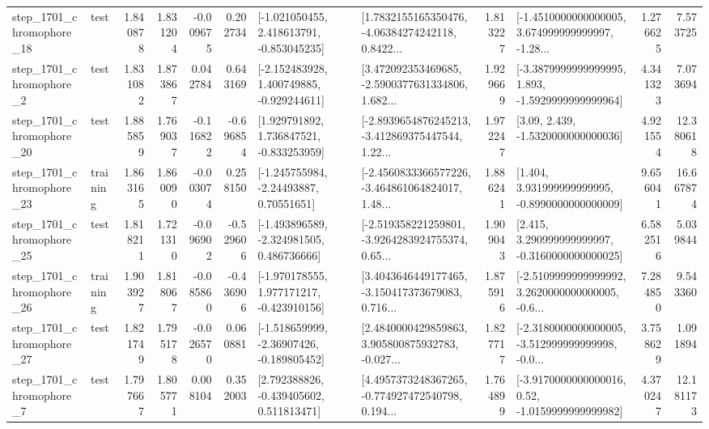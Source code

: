\begin{tabular}{llrrrrllrlrr}
 step\_1701\_chromophore\_18 &      test &      1.840878 &    1.831204 &     -0.009675 &  0.202734 &   [-1.021050455, 2.418613791, -0.853045235] &  [1.7832155165350476, -4.06384274242118, 0.8422... &       1.813227 &  [-1.4510000000000005, 3.674999999999997, -1.28... &            1.276625 &          7.573725 \\
  step\_1701\_chromophore\_2 &      test &      1.831082 &    1.873867 &      0.042784 &  0.643169 &   [-2.152483928, 1.400749885, -0.929244611] &  [3.472092353469685, -2.5900377631334806, 1.682... &       1.929669 &  [-3.3879999999999995, 1.893, -1.5929999999999964] &            4.341323 &          7.073694 \\
 step\_1701\_chromophore\_20 &      test &      1.885859 &    1.769037 &     -0.116822 & -0.696854 &    [1.929791892, 1.736847521, -0.833253959] &  [-2.8939654876245213, -3.412869375447544, 1.22... &       1.972247 &                 [3.09, 2.439, -1.5320000000000036] &            4.921554 &         12.380618 \\
 step\_1701\_chromophore\_23 &  training &      1.863165 &    1.860090 &     -0.003074 &  0.258150 &     [-1.245755984, -2.24493887, 0.70551651] &  [-2.4560833366577226, -3.464861064824017, 1.48... &       1.886241 &    [1.404, 3.931999999999995, -0.8990000000000009] &            9.656041 &         16.667874 \\
 step\_1701\_chromophore\_25 &      test &      1.818211 &    1.721310 &     -0.096902 & -0.529606 &   [-1.493896589, -2.324981505, 0.486736666] &  [-2.519358221259801, -3.9264283924755374, 0.65... &       1.909043 &    [2.415, 3.290999999999997, -0.3160000000000025] &            6.582516 &          5.039844 \\
 step\_1701\_chromophore\_26 &  training &      1.903927 &    1.818067 &     -0.085860 & -0.436906 &   [-1.970178555, 1.977171217, -0.423910156] &  [3.4043646449177465, -3.150417373679083, 0.716... &       1.875916 &  [-2.5109999999999992, 3.2620000000000005, -0.6... &            7.284850 &          9.543360 \\
 step\_1701\_chromophore\_27 &      test &      1.821749 &    1.795178 &     -0.026570 &  0.060881 &   [-1.518659999, -2.36907426, -0.189805452] &  [2.4840000429859863, 3.905800875932783, -0.027... &       1.827717 &  [-2.3180000000000005, -3.512999999999998, -0.0... &            3.758629 &          1.091894 \\
  step\_1701\_chromophore\_7 &      test &      1.797667 &    1.805771 &      0.008104 &  0.352003 &    [2.792388826, -0.439405602, 0.511813471] &  [4.4957373248367265, -0.774927472540798, 0.194... &       1.764899 &   [-3.9170000000000016, 0.52, -1.0159999999999982] &            4.370247 &         12.181173 \\

\end{tabular}
